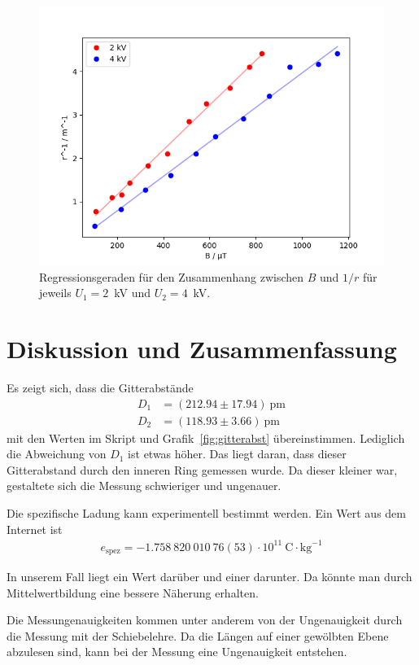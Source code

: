 \documentclass{article}
\begin{document}
\begin{figure}[H]
\includegraphics[scale=0.7]{regression.png}
\caption{Regressionsgeraden für den Zusammenhang zwischen $B$ und $1/r$ für jeweils $U_1=2$~kV und $U_2=4$~kV.}
\label{fig:regression}
\end{figure}


\section{Diskussion und Zusammenfassung}
Es zeigt sich, dass die Gitterabstände 
\begin{align*}
D_1 &= \left(212.94 \pm 17.94\right)~\text{pm}\\
D_2 &= \left(118.93 \pm 3.66\right)~\text{pm}
\end{align*}
mit den Werten im Skript \cite{moodle} und Grafik~\ref{fig:gitterabst} übereinstimmen. Lediglich die Abweichung von $D_1$ ist etwas höher. Das liegt daran, dass dieser Gitterabstand durch den inneren Ring gemessen wurde. Da dieser kleiner war, gestaltete sich die Messung schwieriger und ungenauer. 

Die spezifische Ladung kann experimentell bestimmt werden. Ein Wert aus dem Internet ist
\begin{align*}
e_\text{spez} = -1.758~820~010~76(53)\cdot 10^{11}~\text{C}\cdot\text{kg}^{-1}
\end{align*}

In unserem Fall liegt ein Wert darüber und einer darunter. Da könnte man durch Mittelwertbildung eine bessere Näherung erhalten. 

Die Messungenauigkeiten kommen unter anderem von der Ungenauigkeit durch die Messung mit der Schiebelehre. Da die Längen auf einer gewölbten Ebene abzulesen sind, kann bei der Messung eine Ungenauigkeit entstehen.
\end{document}
